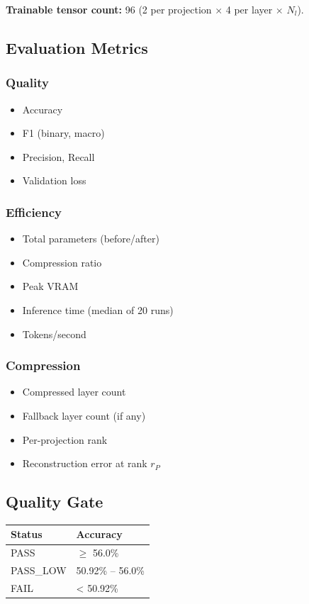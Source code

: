 \textbf{Trainable tensor count:} 96 (2 per projection $\times$ 4 per 
layer $\times$ $N_l$).

\subsection{Evaluation Metrics}

\subsubsection{Quality}
\begin{itemize}
\item Accuracy
\item F1 (binary, macro)
\item Precision, Recall
\item Validation loss

\end{itemize}
\subsubsection{Efficiency}
\begin{itemize}
\item Total parameters (before/after)
\item Compression ratio
\item Peak VRAM
\item Inference time (median of 20 runs)
\item Tokens/second

\end{itemize}
\subsubsection{Compression}
\begin{itemize}
\item Compressed layer count
\item Fallback layer count (if any)
\item Per-projection rank
\item Reconstruction error at rank $r_P$

\end{itemize}
\subsection{Quality Gate}

\begin{table}[H]
\centering
\small
\begin{tabular}{ll}
\toprule
\textbf{Status} & \textbf{Accuracy} \\
\midrule
PASS & $\ge$ 56.0\% \\
PASS\_LOW & 50.92\% -- 56.0\% \\
FAIL & \textless{} 50.92\% \\
\bottomrule
\end{tabular}
\end{table}

